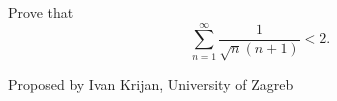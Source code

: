 Prove that
$$\sum\limits_{n = 1}^{\infty}\frac{1}{\sqrt{n}\left(n+1\right)} < 2.$$

Proposed by Ivan Krijan, University of Zagreb
